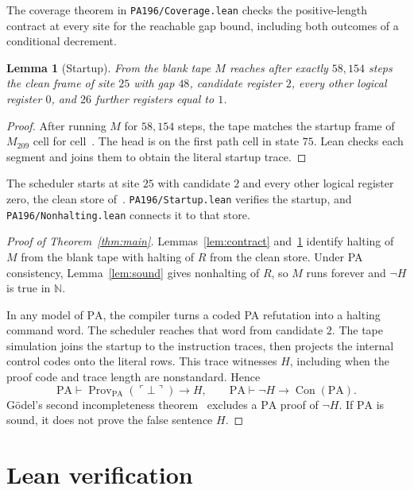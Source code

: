 \documentclass[11pt,letterpaper]{article}
\newtheorem{lemma}[theorem]{Lemma}
\newcommand{\PA}{\mathrm{PA}}
\newcommand{\N}{\mathbb{N}}
\newcommand{\Con}{\operatorname{Con}}
\newcommand{\Prov}{\operatorname{Prov}}
\newcommand{\file}[1]{\texttt{\nolinkurl{#1}}}
\begin{document}
The coverage theorem in \file{PA196/Coverage.lean} checks the
positive-length contract at every site for the reachable gap
bound, including both outcomes of a conditional decrement.

\begin{lemma}[Startup]\label{lem:startup}
From the blank tape $M$ reaches after exactly $58{,}154$ steps the
clean frame of site $25$ with gap $48$, candidate register $2$, every
other logical register $0$, and $26$ further registers equal to $1$.
\end{lemma}

\begin{proof}
After running $M$ for $58{,}154$ steps, the tape matches the startup
frame of $M_{209}$ cell for cell~\cite[\S2]{pa209}. The head is on
the first path cell in state $75$. Lean checks each segment and
joins them to obtain the literal startup trace.
\end{proof}

The scheduler starts at site $25$ with candidate $2$ and every
other logical register zero, the clean store of~\cite{pa209}.
\file{PA196/Startup.lean} verifies the startup, and
\file{PA196/Nonhalting.lean} connects it to that store.

\begin{proof}[Proof of Theorem~\ref{thm:main}]
Lemmas~\ref{lem:contract} and~\ref{lem:startup} identify halting of
$M$ from the blank tape with halting of $R$ from the clean store.
Under PA consistency, Lemma~\ref{lem:sound} gives nonhalting of $R$,
so $M$ runs forever and $\neg H$ is true in $\N$.

In any model of $\PA$, the compiler turns a coded PA refutation into
a halting command word. The scheduler reaches that word from
candidate $2$. The tape simulation joins the startup to the
instruction traces, then projects the internal control codes onto
the literal rows. This trace witnesses $H$, including when the proof
code and trace length are nonstandard. Hence
\[
   \PA\vdash \Prov_{\PA}(\ulcorner\bot\urcorner)\to H,
   \qquad
   \PA\vdash \neg H\to\Con(\PA).
\]
G\"odel's second incompleteness theorem~\cite{goedel} excludes a
$\PA$ proof of $\neg H$. If $\PA$ is sound, it does not prove the
false sentence $H$.
\end{proof}

\clearpage
\section{Lean verification}\label{sec:status}
\end{document}
